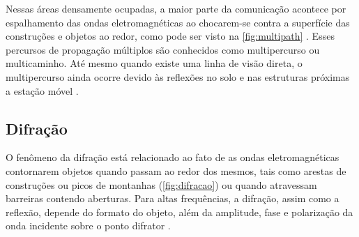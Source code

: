 Nessas áreas densamente ocupadas, a maior parte da comunicação acontece por espalhamento das ondas eletromagnéticas ao chocarem-se contra a superfície das construções e objetos ao redor, como pode ser visto na \autoref{fig:multipath} \cite{haykin2008}.  Esses percursos de propagação múltiplos são conhecidos como multipercurso ou multicaminho. Até mesmo quando existe uma linha de visão direta, o multipercurso ainda ocorre devido às reflexões no solo e nas estruturas próximas a estação móvel \cite{rappaport2009}.

\begin{figure}[H]
	\centering
\end{figure}

\subsection{Difração}
\label{sub:difracao}

O fenômeno da difração está relacionado ao fato de as ondas eletromagnéticas contornarem objetos quando passam ao redor dos mesmos, tais como arestas de construções ou picos de montanhas (\autoref{fig:difracao}) ou quando atravessam barreiras contendo aberturas. Para altas frequências, a difração, assim como a reflexão, depende do formato do objeto, além da amplitude, fase e polarização da onda incidente sobre o ponto difrator \cite{rappaport2009}.

\begin{figure}[H]
	\centering
\end{figure}

